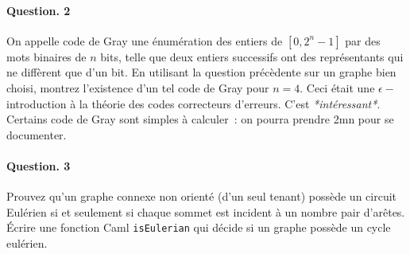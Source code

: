 \documentclass[10pt,a4paper]{article}
\begin{document}
\paragraph{Question. 2\\}
On appelle code de Gray une énumération des entiers de $[0,2^n-1]$ par
des mots binaires de $n$ bits, telle que deux entiers successifs ont des
représentants qui ne diffèrent que d'un bit. En utilisant la question
précèdente sur un graphe bien choisi, montrez l'existence d'un tel code
de Gray pour $n=4$. Ceci était une $\epsilon-$introduction à la théorie
des codes correcteurs d'erreurs. C'est \emph{*intéressant*}. Certains
code de Gray sont simples à calculer~: on pourra prendre 2mn pour se
documenter.

\paragraph{Question. 3\\} Prouvez qu'un graphe connexe non orienté (d'un seul tenant) possède un circuit
Eulérien si et seulement si chaque sommet est incident à un nombre pair
d'arêtes. Écrire une fonction Caml \texttt{isEulerian} qui décide si un graphe possède un
cycle eulérien. 
\end{document}
